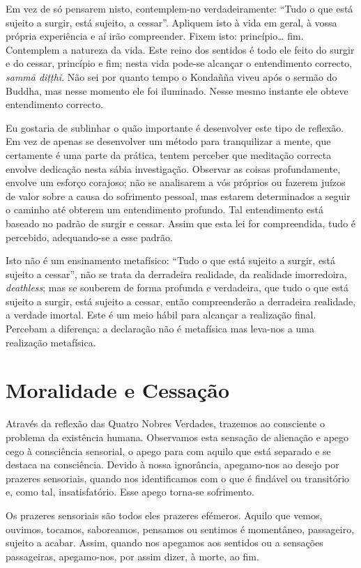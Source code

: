 Em vez de só pensarem nisto, contemplem-no verdadeiramente: “Tudo o que está
sujeito a surgir, está sujeito, a cessar”. Apliquem isto à vida em geral, à
vossa própria experiência e aí irão compreender. Fixem isto: princípio\ldots{}
fim. Contemplem a natureza da vida. Este reino dos sentidos é todo ele feito do
surgir e do cessar, princípio e fim; nesta vida pode-se alcançar o entendimento
correcto, \emph{sammā diṭṭhi}. Não sei por quanto tempo o Kondañña viveu após o
sermão do Buddha, mas nesse momento ele foi iluminado. Nesse mesmo instante ele
obteve entendimento correcto.

Eu gostaria de sublinhar o quão importante é desenvolver este tipo de reflexão.
Em vez de apenas se desenvolver um método para tranquilizar a mente, que
certamente é uma parte da prática, tentem perceber que meditação correcta
envolve dedicação nesta sábia investigação. Observar as coisas profundamente,
envolve um esforço corajoso; não se analisarem a vós próprios ou fazerem juízos
de valor sobre a causa do sofrimento pessoal, mas estarem determinados a seguir
o caminho até obterem um entendimento profundo. Tal entendimento está baseado no
padrão de surgir e cessar. Assim que esta lei for compreendida, tudo é
percebido, adequando-se a esse padrão.

Isto não é um ensinamento metafísico: “Tudo o que está sujeito a surgir, está
sujeito a cessar”, não se trata da derradeira realidade, da realidade imorredoira,
\emph{deathless}; mas se souberem de forma profunda e verdadeira, que tudo o que
está sujeito a surgir, está sujeito a cessar, então compreenderão a derradeira
realidade, a verdade imortal. Este é um meio hábil para alcançar a realização
final. Percebam a diferença: a declaração não é metafísica mas leva-nos a uma
realização metafísica.

\section{Moralidade e Cessação}

Através da reflexão das Quatro Nobres Verdades, trazemos ao consciente o
problema da existência humana. Observamos esta sensação de alienação e apego
cego à consciência sensorial, o apego para com aquilo que está separado e se
destaca na consciência. Devido à nossa ignorância, apegamo-nos ao desejo por
prazeres sensoriais, quando nos identificamos com o que é findável ou
transitório e, como tal, insatisfatório. Esse apego torna-se sofrimento.

Os prazeres sensoriais são todos eles prazeres efémeros. Aquilo que vemos,
ouvimos, tocamos, saboreamos, pensamos ou sentimos é momentâneo, passageiro,
sujeito a acabar. Assim, quando nos apegamos aos sentidos ou a sensações
passageiras, apegamo-nos, por assim dizer, à morte, ao fim.

